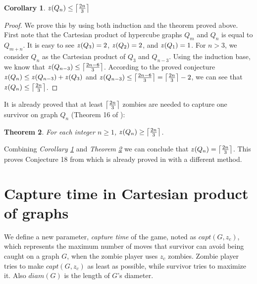 \documentclass[1p]{elsarticle}
\DeclarePairedDelimiter\ceil{\lceil}{\rceil} \DeclarePairedDelimiter\floor{\lfloor}{\rfloor}
\newtheorem{theorem}{Theorem}
\newtheorem{corollary}[theorem]{Corollary}
\newcommand{\zn}{\ooalign{$z$\cr\hfil\rule[.5ex]{.2em}{.08ex}\hfil\cr}}
\begin{document}
\begin{corollary}
	\label{C3}
	$\zn(Q_{n}) \leq \ceil*{\frac{2n}{3}}$
\end{corollary}
\begin{proof}
	We prove this by using both induction and the theorem proved above. First note that the Cartesian product of
	hypercube graphs $Q_{m}$ and $Q_{n}$ is equal to $Q_{m+n}$. It is easy to see $\zn(Q_3) = 2$, $\zn(Q_2) = 2$, and
	$\zn(Q_1) = 1$. For $n > 3$, we consider $Q_n$ as the Cartesian product of $Q_3$ and $Q_{n-3}$. Using the induction
	base, we know that $\zn(Q_{n-3}) \leq \ceil*{\frac{2n - 6}{3}}$. According to the proved conjecture $\zn(Q_n) \leq
	\zn(Q_{n-3}) + \zn(Q_3)$ and $\zn(Q_{n-3}) \leq \ceil*{\frac{2n - 6}{3}} = \ceil*{\frac{2n}{3}} - 2$, we can see that
	$\zn(Q_n) \leq \ceil*{\frac{2n}{3}}$.
\end{proof}

It is already proved that at least $\ceil*{\frac{2n}{3}}$ zombies are needed to capture one survivor on graph $Q_n$
(Theorem 16 of \cite{Fitz16}):

\begin{theorem}
	\label{T4}
	For each integer $n \geq 1$, $\zn(Q_n) \geq \ceil*{\frac{2n}{3}} $.
\end{theorem}

Combining {\it Corollary \ref{C3}} and {\it Theorem \ref{T4}} we can conclude that $\zn(Q_n) = \ceil*{\frac{2n}{3}}$.
This proves Conjecture 18 from \cite{Fitz16} which is already proved in \cite{Offner19} with a different method. 
	

\section{Capture time in Cartesian product of graphs}\label{capturetime}
	We define a new parameter, {\it capture time} of the game, noted as $capt(G,z_c)$, which represents the maximum
	number of moves that survivor can avoid being caught on a graph $G$, when the zombie player uses $z_c$ zombies. Zombie
	player tries to make $capt(G,z_c)$ as least as possible, while survivor tries to maximize it. Also $diam(G)$ is the
	length of $G$'s diameter.
\end{document}
